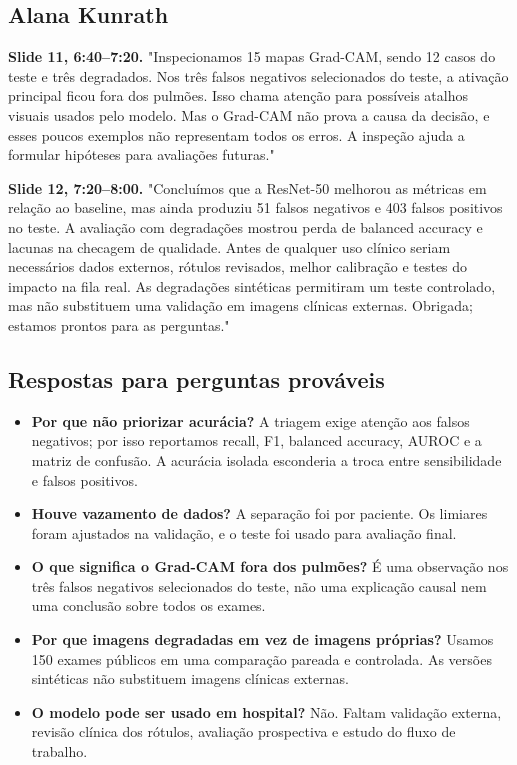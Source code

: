 \documentclass[11pt,a4paper]{article}
\begin{document}
\subsection*{Alana Kunrath}

\textbf{Slide 11, 6:40--7:20.} "Inspecionamos 15 mapas Grad-CAM, sendo 12 casos do teste e três degradados. Nos três falsos negativos selecionados do teste, a ativação principal ficou fora dos pulmões. Isso chama atenção para possíveis atalhos visuais usados pelo modelo. Mas o Grad-CAM não prova a causa da decisão, e esses poucos exemplos não representam todos os erros. A inspeção ajuda a formular hipóteses para avaliações futuras."\par

\textbf{Slide 12, 7:20--8:00.} "Concluímos que a ResNet-50 melhorou as métricas em relação ao baseline, mas ainda produziu 51 falsos negativos e 403 falsos positivos no teste. A avaliação com degradações mostrou perda de balanced accuracy e lacunas na checagem de qualidade. Antes de qualquer uso clínico seriam necessários dados externos, rótulos revisados, melhor calibração e testes do impacto na fila real. As degradações sintéticas permitiram um teste controlado, mas não substituem uma validação em imagens clínicas externas. Obrigada; estamos prontos para as perguntas."\par

\subsection*{Respostas para perguntas prováveis}

\begin{itemize}
\item \textbf{Por que não priorizar acurácia?} A triagem exige atenção aos falsos negativos; por isso reportamos recall, F1, balanced accuracy, AUROC e a matriz de confusão. A acurácia isolada esconderia a troca entre sensibilidade e falsos positivos.
\item \textbf{Houve vazamento de dados?} A separação foi por paciente. Os limiares foram ajustados na validação, e o teste foi usado para avaliação final.
\item \textbf{O que significa o Grad-CAM fora dos pulmões?} É uma observação nos três falsos negativos selecionados do teste, não uma explicação causal nem uma conclusão sobre todos os exames.
\item \textbf{Por que imagens degradadas em vez de imagens próprias?} Usamos 150 exames públicos em uma comparação pareada e controlada. As versões sintéticas não substituem imagens clínicas externas.
\item \textbf{O modelo pode ser usado em hospital?} Não. Faltam validação externa, revisão clínica dos rótulos, avaliação prospectiva e estudo do fluxo de trabalho.
\end{itemize}
\end{document}
